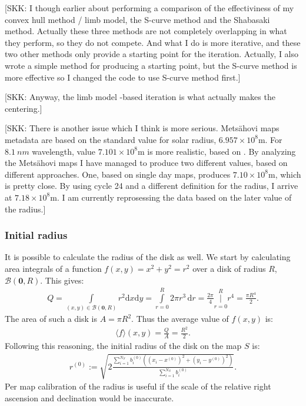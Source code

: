 \documentclass{aa}
\newcommand{\skk}[1]{\textcolor{midorange}{[SKK: #1]}} %
\newcommand{\eqnl}[2]{\begin{eqnarray}\label{#1}#2\end{eqnarray}}
\newcommand{\intef}[4]{\int \limits_{#1 = #2}^{#3} \! #4 \, \mathrm{d} #1}
\newcommand{\intes}[4]{\operatorname{\Bigg|} \limits_{#1 = #2}^{#3} \!\!\!\!\! #4}
\newcommand{\ave}[1]{\langle #1 \rangle}
\newcommand{\dd}[0]{\mathrm{d}}
\begin{document}
    \skk{I though earlier about performing a comparison of the effectiviness of my convex hull method / limb model, the 
    S-curve method and the Shabasaki method. Actually these three methods are not completely overlapping in what they 
    perform, so they do not compete. And what I do is more iterative, and these two other methods only provide a 
    starting point for the iteration. Actually, I also wrote a simple method for producing a starting point, but the 
    S-curve method is more effective so I changed the code to use S-curve method first.}

    \skk{Anyway, the limb model -based iteration is what actually makes the centering.}
    
    \skk{There is another issue which I think is more serious. Metsähovi maps metadata are based on the standard value 
    for solar radius, $6.957 \times 10^8 \mathrm{m}$. For $\SI{8.1}{nm}$ wavelength, value $7.101 \times 10^8 
    \mathrm{m}$ is more realistic, based on \cite{Rozelot15}. By analyzing the Metsähovi maps I have managed to produce 
    two different values, based on different approaches. One, based on single day maps, produces $7.10 \times 10^8 
    \mathrm{m}$, which is pretty close. By using cycle 24 and a different definition for the radius, I arrive at $7.18 
    \times 10^8 \mathrm{m}$. I am currently reprosessing the data based on the later value of the radius.}
    
  \subsubsection{Initial radius}\label{sect:initial_radius}

  It is possible to calculate the radius of the disk as well. We start by calculating area integrals of a function $f(x,y) = x^2+y^2 = r^2$ over a disk of radius $R$, $\mathcal{B}(\bm{0},R)$. This gives:
  \eqnl{initial_radius}{
  Q = \int \limits_{(x,y) \in \mathcal{B}(\bm{0},R)} \! r^2 \dd x \dd y = \intef{r}{0}{R}{2 \pi r^3} = \frac{2 \pi}{4} \intes{r}{0}{R}{r^4} = \frac{\pi R^4}{2} \text{.}
  }
  The area of such a disk is $A = \pi R^2$. Thus the average value of $f(x,y)$ is:
  \eqnl{initial_radius2}{
  \ave f(x,y) = \frac{Q}{A} = \frac{R^2}{2} \text{.}
  }
  Following this reasoning, the initial radius of the disk on the map $S$ is:
  \eqnl{initial_radius3}{
  r^{(0)} := \sqrt{2 \frac{\sum \limits_{i=1}^{N_S} b_i^{(0)} \left( \left( x_i - x^{(0)} \right)^2 + \left( y_i - y^{(0)} \right)^2 \right)}{\sum \limits_{i=1}^{N_S} b_i^{(0)}}} \text{.}
  }
  Per map calibration of the radius is useful if the scale of the relative right ascension and declination would be inaccurate.
\end{document}
